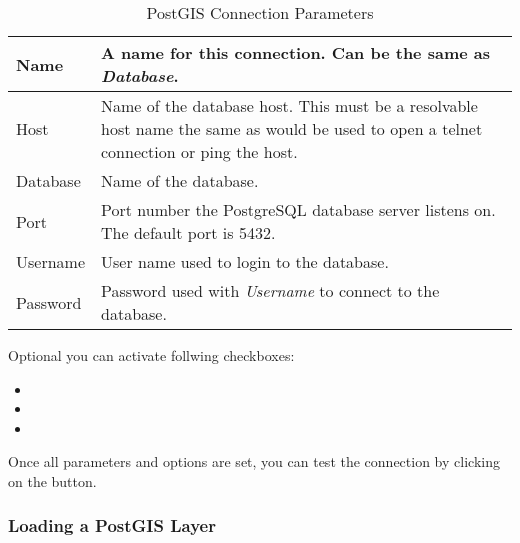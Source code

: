\begin{table}[ht]
\centering
\caption{PostGIS Connection
Parameters}\label{tab:postgis_connection_parms}\medskip
 \begin{tabular}{|l|p{5in}|}
\hline Name & A name for this connection. Can be the same as \textsl{Database}.
\\
\hline Host \index{PostgreSQL!host}
& Name of the database host. This must be a resolvable host name the same as
would be used to open a telnet connection or ping the host. \\
\hline Database \index{PostgreSQL!database} & Name of the database.  \\
\hline Port \index{PostgreSQL!port}& Port number the PostgreSQL database
server listens on. The default port is 5432.\\
\hline Username \index{PostgreSQL!username}& User name used to login to the
database. \\
\hline Password \index{PostgreSQL!password}& Password used with
\textsl{Username} to connect to the database.\\
\hline
\end{tabular}
\end{table}

Optional you can activate follwing checkboxes:

\begin{itemize}
\item {}
\item {}
\item {}
\end{itemize}

Once all parameters and options are set, you can test the connection by
clicking on the  button.

\begin{Tip}\caption{\textsc{QGIS User Settings and
Security}}
\end{Tip}

\subsubsection{Loading a PostGIS Layer}

